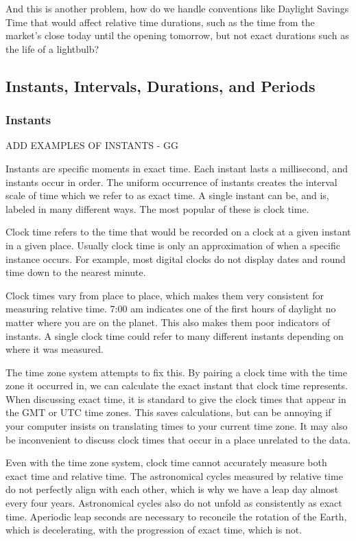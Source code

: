 \documentclass[article]{jss}
\begin{document}
And this is another problem, how do we handle conventions like Daylight Savings Time that would affect relative time durations, such as the time from the market's close today until the opening tomorrow, but not exact durations such as the life of a lightbulb?

\subsection{Instants, Intervals, Durations, and Periods}
\label{sec:types}

\subsubsection{Instants}

ADD EXAMPLES OF INSTANTS - GG

Instants are specific moments in exact time. Each instant lasts a millisecond, and instants occur in order. The uniform occurrence of instants creates the interval scale of time which we refer to as exact time. A single instant can be, and is, labeled in many different ways.  The most popular of these is clock time.

Clock time refers to the time that would be recorded on a clock at a given instant in a given place. Usually clock time is only an approximation of when a specific instance occurs. For example, most digital clocks do not display dates and round time down to the nearest minute.

Clock times vary from place to place, which makes them very consistent for measuring relative time.  7:00 am indicates one of the first hours of daylight no matter where you are on the planet. This also makes them poor indicators of instants. A single clock time could refer to many different instants depending on where it was measured.

The time zone system attempts to fix this.  By pairing a clock time with the time zone it occurred in, we can calculate the exact instant that clock time represents. When discussing exact time, it is standard to give the clock times that appear in the GMT or UTC time zones.  This saves calculations, but can be annoying if your computer insists on translating times to your current time zone.  It may also be inconvenient to discuss clock times that occur in a place unrelated to the data.

Even with the time zone system, clock time cannot accurately measure both exact time and relative time. The astronomical cycles measured by relative time do not perfectly align with each other, which is why we have a leap day almost every four years. Astronomical cycles also do not unfold as consistently as exact time. Aperiodic leap seconds are necessary to reconcile the rotation of the Earth, which is decelerating, with the progression of exact time, which is not.
\end{document}

